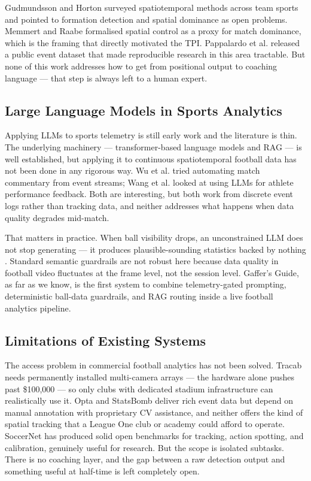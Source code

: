 \documentclass[conference]{IEEEtran}
\begin{document}
Gudmundsson and Horton \cite{gudmundsson2017} surveyed spatiotemporal methods across team sports and pointed to formation detection and spatial dominance as open problems. Memmert and Raabe \cite{memmert2018} formalised spatial control as a proxy for match dominance, which is the framing that directly motivated the TPI. Pappalardo et al. \cite{pappalardo2019} released a public event dataset that made reproducible research in this area tractable. But none of this work addresses how to get from positional output to coaching language --- that step is always left to a human expert.

\subsection{Large Language Models in Sports Analytics}

Applying LLMs to sports telemetry is still early work and the literature is thin. The underlying machinery --- transformer-based language models \cite{vaswani2017} and RAG \cite{lewis2020} --- is well established, but applying it to continuous spatiotemporal football data has not been done in any rigorous way. Wu et al. \cite{wu2021} tried automating match commentary from event streams; Wang et al. \cite{wang2022} looked at using LLMs for athlete performance feedback. Both are interesting, but both work from discrete event logs rather than tracking data, and neither addresses what happens when data quality degrades mid-match.

That matters in practice. When ball visibility drops, an unconstrained LLM does not stop generating --- it produces plausible-sounding statistics backed by nothing \cite{ji2023}. Standard semantic guardrails are not robust here because data quality in football video fluctuates at the frame level, not the session level. Gaffer's Guide, as far as we know, is the first system to combine telemetry-gated prompting, deterministic ball-data guardrails, and RAG routing inside a live football analytics pipeline.

\subsection{Limitations of Existing Systems}

The access problem in commercial football analytics has not been solved. Tracab needs permanently installed multi-camera arrays --- the hardware alone pushes past \$100,000 --- so only clubs with dedicated stadium infrastructure can realistically use it. Opta and StatsBomb deliver rich event data but depend on manual annotation with proprietary CV assistance, and neither offers the kind of spatial tracking that a League One club or academy could afford to operate. SoccerNet \cite{giancola2022} has produced solid open benchmarks for tracking, action spotting, and calibration, genuinely useful for research. But the scope is isolated subtasks. There is no coaching layer, and the gap between a raw detection output and something useful at half-time is left completely open.
\end{document}

